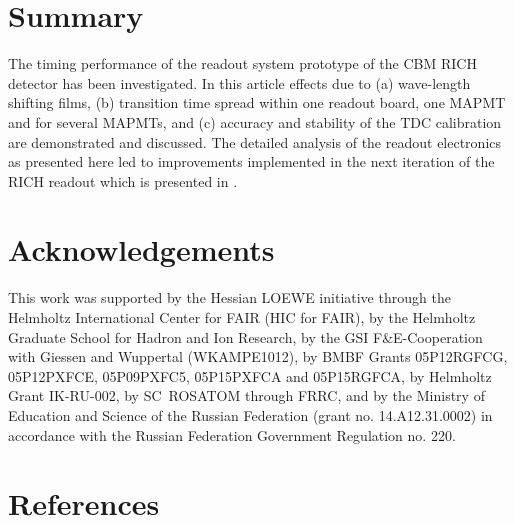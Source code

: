 \documentclass[final,5p,times,twocolumn]{elsarticle}
\begin{document}
\section{Summary}

The timing performance of the readout system prototype of the CBM RICH detector has been investigated. In this article effects due to (a) wave-length shifting films, (b) transition time spread within one readout board, one MAPMT and for several MAPMTs, and (c) accuracy and stability of the TDC calibration are demonstrated and discussed. The detailed analysis of the readout electronics as presented here led to improvements implemented in the next iteration of the RICH readout which is presented in \cite{PAULY}.


\section*{Acknowledgements}

This work was supported by the Hessian LOEWE initiative through the Helmholtz International Center for FAIR (HIC for FAIR), by the Helmholtz Graduate School for Hadron and Ion Research, by the GSI F\&E-Cooperation with Giessen and Wuppertal (WKAMPE1012), by BMBF Grants 05P12RGFCG, 05P12PXFCE, 05P09PXFC5, 05P15PXFCA and 05P15RGFCA, by Helmholtz Grant IK-RU-002, by SC~ROSATOM through FRRC, and by the Ministry of Education and Science of the Russian Federation (grant no. 14.A12.31.0002) in accordance with the Russian Federation Government Regulation no. 220.


\section*{References}
\end{document}

